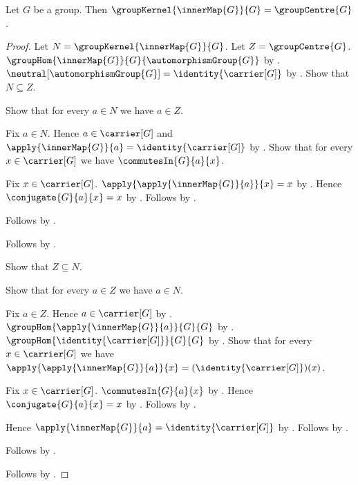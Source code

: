 \begin{theorem}\label{inner_map_kernel_is_centre}
    Let $G$ be a group.
    Then
        $\groupKernel{\innerMap{G}}{G}
        =\groupCentre{G}$.
\end{theorem}
\begin{proof}
    Let $N=\groupKernel{\innerMap{G}}{G}$.
    Let $Z=\groupCentre{G}$.
    $\groupHom{\innerMap{G}}{G}{\automorphismGroup{G}}$ by
        .
    $\neutral[\automorphismGroup{G}]=\identity{\carrier[G]}$ by
        .
    Show that $N\subseteq Z$.
    \begin{subproof}
        Show that for every $a\in N$ we have $a\in Z$.
        \begin{subproof}
            Fix $a\in N$.
            Hence $a\in\carrier[G]$ and
                $\apply{\innerMap{G}}{a}=\identity{\carrier[G]}$ by
                .
            Show that for every $x\in\carrier[G]$ we have
                $\commutesIn{G}{a}{x}$.
            \begin{subproof}
                Fix $x\in\carrier[G]$.
                $\apply{\apply{\innerMap{G}}{a}}{x}=x$ by
                    .
                Hence $\conjugate{G}{a}{x}=x$ by
                    .
                Follows by .
            \end{subproof}
            Follows by .
        \end{subproof}
        Follows by .
    \end{subproof}
    Show that $Z\subseteq N$.
    \begin{subproof}
        Show that for every $a\in Z$ we have $a\in N$.
        \begin{subproof}
            Fix $a\in Z$.
            Hence $a\in\carrier[G]$ by
                .
            $\groupHom{\apply{\innerMap{G}}{a}}{G}{G}$ by
                .
            $\groupHom{\identity{\carrier[G]}}{G}{G}$ by
                .
            Show that for every $x\in\carrier[G]$ we have
                $\apply{\apply{\innerMap{G}}{a}}{x}=
                    (\identity{\carrier[G]})(x)$.
            \begin{subproof}
                Fix $x\in\carrier[G]$.
                $\commutesIn{G}{a}{x}$ by
                    .
                Hence $\conjugate{G}{a}{x}=x$ by
                    .
                Follows by .
            \end{subproof}
            Hence $\apply{\innerMap{G}}{a}=\identity{\carrier[G]}$ by
                .
            Follows by .
        \end{subproof}
        Follows by .
    \end{subproof}
    Follows by .
\end{proof}

